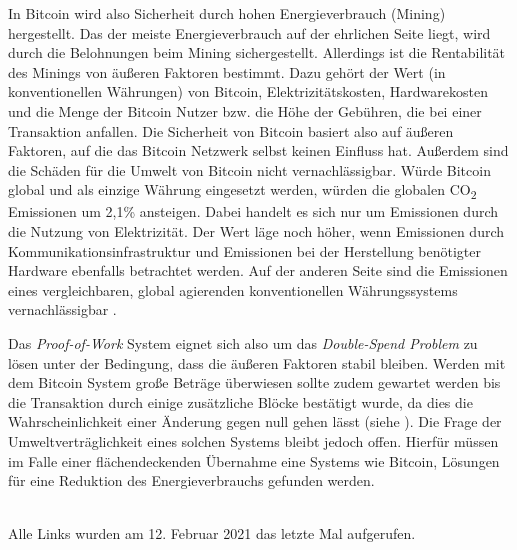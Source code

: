 \documentclass[ngerman,runningheads,a4paper]{llncs}[2018/03/10]
\begin{document}
In Bitcoin wird also Sicherheit durch hohen Energieverbrauch (Mining) hergestellt. Das der meiste Energieverbrauch auf der ehrlichen Seite liegt, wird durch die Belohnungen beim Mining sichergestellt. Allerdings ist die Rentabilität des Minings von äußeren Faktoren bestimmt. Dazu gehört der Wert (in konventionellen Währungen) von Bitcoin, Elektrizitätskosten, Hardwarekosten und die Menge der Bitcoin Nutzer bzw. die Höhe der Gebühren, die bei einer Transaktion anfallen. Die Sicherheit von Bitcoin basiert also auf äußeren Faktoren, auf die das Bitcoin Netzwerk selbst keinen Einfluss hat. Außerdem sind die Schäden für die Umwelt von Bitcoin nicht vernachlässigbar. Würde Bitcoin global und als einzige Währung eingesetzt werden, würden die globalen CO\textsubscript{2} Emissionen um 2,1\% ansteigen. Dabei handelt es sich nur um Emissionen durch die Nutzung von Elektrizität. Der Wert läge noch höher, wenn Emissionen durch Kommunikationsinfrastruktur und Emissionen bei der Herstellung benötigter Hardware ebenfalls betrachtet werden. Auf der anderen Seite sind die Emissionen eines vergleichbaren, global agierenden  konventionellen Währungssystems vernachlässigbar \citep{Becker2013}. 

Das \textit{Proof-of-Work} System eignet sich also um das \textit{Double-Spend Problem} zu lösen unter der Bedingung, dass die äußeren Faktoren stabil bleiben. Werden mit dem Bitcoin System große Beträge überwiesen sollte zudem gewartet werden bis die Transaktion durch einige zusätzliche Blöcke bestätigt wurde, da dies die Wahrscheinlichkeit einer Änderung gegen null gehen lässt (siehe ). Die Frage der Umweltverträglichkeit eines solchen Systems bleibt jedoch offen. Hierfür müssen im Falle einer flächendeckenden Übernahme eine Systems wie Bitcoin, Lösungen für eine Reduktion des Energieverbrauchs gefunden werden. 

\renewcommand{\bibsection}{\section*{Referenzen}} %

\begingroup
  \ifluatex
  \else
  \fi
  \small %
  
\endgroup

\ \\
%
Alle Links wurden am 12. Februar 2021 das letzte Mal aufgerufen.
\end{document}
